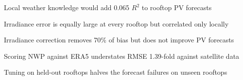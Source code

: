 \item Local weather knowledge would add 0.065 $R^2$ to rooftop PV forecasts
\item Irradiance error is equally large at every rooftop but correlated only locally
\item Irradiance correction removes 70\% of bias but does not improve PV forecasts
\item Scoring NWP against ERA5 understates RMSE 1.39-fold against satellite data
\item Tuning on held-out rooftops halves the forecast failures on unseen rooftops

